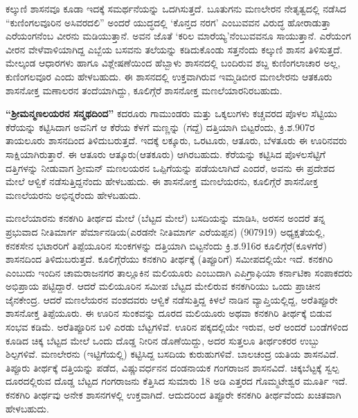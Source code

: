 ಕಲ್ಕುಣಿ ಶಾಸನವೂ ಕೂಡಾ ಇದಕ್ಕೆ ಸಮರ್ಥನೆಯನ್ನು ಒದಗಿಸುತ್ತದೆ. ಬೂತುಗನು ಮಣಲೇರನ ನೇತೃತ್ವದಲ್ಲಿ ನಡೆಸಿದ “ಕುಣಿಂಗಲವೂರಿನ ಅಸಿವರದಲಿ” ಅಂದರೆ ಯುದ್ಧದಲ್ಲಿ ‘ಕೊನ್ತದ ನರಗ’ ಎಂಬುವವನ ವಿರುದ್ಧ ಹೋರಾಡುತ್ತಾ ಎರೆಯಂಗನೆಂಬ ವೀರನು ಮಡಿಯುತ್ತಾನೆ. ಅವನ ಜೊತೆ ‘ಕರಿಲ ಮಾರೆಯ್ಯ’ನೆಂಬುವವನೂ ಸಾಯುತ್ತಾನೆ. ಎರೆಯಂಗ ವೀರನ ವೇಳೆವಾಳಿಯಾಗಿದ್ದ ಎಬ್ಬೆಯ ಬಸವನು ತಲೆಯನ್ನು ಕಡಿದುಕೊಂಡು ಸತ್ತನೆಂದು ಕಲ್ಕುಣಿ ಶಾಸನ ತಿಳಿಸುತ್ತದೆ. ಮೇಲ್ಕಂಡ ಆಧಾರಗಳು ಹಾಗೂ ವಿಶ್ಲೇಷಣೆಯಿಂದ ಹೆಬ್ಬಾಳು ಶಾಸನದಲ್ಲಿ ಬಂದಿರುವ ಶಬ್ದ ಕುಣಿಂಗಲಾಚಾರ ಅಲ್ಲ, ಕುಣಿಂಗಲವೂರ ಎಂದು ಹೇಳಬಹುದು. ಈ ಶಾಸನದಲ್ಲಿ ಉಕ್ತವಾಗಿರುವ ಇಮ್ಮಡಿಬೀರ ಮಣಲೇರನು ಆತಕೂರು ಶಾಸನೋಕ್ತ ಮಣಾಲರನ ತಂದೆಯಾಗಿದ್ದು, ಕೂಲಿಗ್ಗೆರೆ ಶಾಸನೋಕ್ತ ಮಣಲೆಯಾರನಿರಬಹುದು. 

\textbf{“ಶ‍್ರೀಮನ್ಮಣಲಯರನ ಸನ್ಮಥದಿಂದ”} ಕದರೂರು ಗಾಮುಂಡರು ಮತ್ತು ಒಕ್ಕಲುಗಳು ಕಚ್ಚವರದ ಪೊಳಲ ಸೆಟ್ಟಿಯು ಕೆರೆಯನ್ನು ಕಟ್ಟಿಸಿದಾಗ ಅವನಿಗೆ ಆ ಕೆರೆಯ ಕೆಳಗೆ ಮಣ್ಣನ್ನು (ಗದ್ದೆ) ದತ್ತಿಯಾಗಿ ಬಿಟ್ಟರೆಂದು, ಕ್ರಿ.ಶ.907ರ ತಾಯಲೂರು ಶಾಸನದಿಂದ ತಿಳಿದುಬರುತ್ತದೆ. ಇದಕ್ಕೆ ಲಕ್ಕೂರು, ಒರಟೂರು, ಆತೂರು, ಬೆಳತೂರು ಈ ಊರಿನವರು ಸಾಕ್ಷಿಯಾಗಿರುತ್ತಾರೆ. ಈ ಆತೂರು ಆತ್ಕೂರು(ಆತಕೂರು) ಆಗಿರಬಹುದು. ಕೆರೆಯನ್ನು ಕಟ್ಟಿಸಿದ ಪೊಳಲಸೆಟ್ಟಿಗೆ ದತ್ತಿಗಳನ್ನು ನೀಡುವಾಗ ಶ‍್ರೀಮನ್​ ಮಣಲಯರನ ಒಪ್ಪಿಗೆಯನ್ನು ಪಡೆಯಲಾಗಿದೆ ಎಂದರೆ, ಅವನು ಈ ಪ್ರದೇಶದ ಮೇಲೆ ಆಳ್ವಿಕೆ ನಡೆಸುತ್ತಿದ್ದನೆಂದು ಹೇಳಬಹುದು. ಈ ಶಾಸನೋಕ್ತ ಮಣಲೆಯರನು, ಕೂಲಿಗ್ಗೆರೆ ಶಾಸನೋಕ್ತ ಮಣಲೆಯರನು ಅಭಿನ್ನರೆಂದು ಹೇಳಬಹುದು.

ಮಣಲೆಯಾರನು ಕನಕಗಿರಿ ತೀರ್ಥದ ಮೇಲೆ (ಬೆಟ್ಟದ ಮೇಲೆ) ಬಸದಿಯನ್ನು ಮಾಡಿಸಿ, ಅರಸನ ಅಂದರೆ ತನ್ನ ಪ್ರಭುವಾದ ನೀತಿಮಾರ್ಗ ಪೆರ್ಮಾನಡಿಯ(ಎರಡನೇ ನೀತಿಮಾರ್ಗ ಎರೆಯಪ್ಪನ) (907919) ಅಧ್ಯಕ್ಷತೆಯಲ್ಲಿ, ಕನಕಸೇನ ಭಟಾರರಿಗೆ ತಿಪ್ಪೆಯೂರಿನ ಸುಂಕಗಳನ್ನು ದತ್ತಿಯಾಗಿ ಬಿಟ್ಟನೆಂದು ಕ್ರಿ.ಶ.916ರ ಕೂಲಿಗ್ಗೆರೆ(ಕೂಳಗೆರೆ) ಶಾಸನದಿಂದ ತಿಳಿದುಬರುತ್ತದೆ. ಕೂಲಿಗ್ಗೆರೆಯು ಕನಕಗಿರಿ ತೀರ್ಥಕ್ಕೆ (ತಿಪ್ಪೂರಿಗೆ) ಸಮೀಪದಲ್ಲಿಯೇ ಇದೆ. ಕನಕಗಿರಿ ಎಂಬುದು ಇಂದಿನ ಚಾಮರಾಜನಗರ ತಾಲ್ಲೂಕಿನ ಮಲಿಯೂರು ಎಂಬುದಾಗಿ ಎಪಿಗ್ರಾಫಿಯಾ ಕರ್ನಾಟಿಕಾ ಸಂಪಾಕದರು ಅಭಿಪ್ರಾಯ ಪಟ್ಟಿದ್ದಾರೆ. ಆದರೆ ಮಲಿಯೂರಿನ ಸಮೀಪ ಬೆಟ್ಟದ ಮೇಲಿರುವ ಕನಕಗಿರಿಯು ಒಂದು ಪ್ರಾಚೀನ ಜೈನಕೇಂದ್ರ. ಆದರೆ ಮಣಲೆಯರನ ವಂಶದವರು ಆಳ್ವಿಕೆ ನಡೆಸುತ್ತಿದ್ದ ಕಿಳಲೆ ನಾಡಿನ ವ್ಯಾಪ್ತಿಯಲ್ಲಿದ್ದ, ಅರೆತಿಪ್ಪೂರೇ ಶಾಸನೋಕ್ತ ತಿಪ್ಪೆಯೂರು. ಈ ಊರಿನ ಸುಂಕವನ್ನು ದೂರದ ಮಲಿಯೂರು ಅಥವಾ ಕನಕಗಿರಿ ತೀರ್ಥಕ್ಕೆ ಬಿಡುವ ಸಂಭವ ಕಡಿಮೆ. ಅರೆತಿಪ್ಪೂರಿನ ಬಳಿ ಎರಡು ಬೆಟ್ಟಗಳಿವೆ. ಊರಿನ ಪಕ್ಕದಲ್ಲಿಯೇ ಇರುವ, ಅರೆ ಅಂದರೆ ಬಂಡೆಗಳಿಂದ ಕೂಡಿದ ಚಿಕ್ಕ ಬೆಟ್ಟದ ಮೇಲೆ ಒಂದು ದೊಡ್ಡ ನೀರಿನ ಡೊಣೆಯಿದ್ದು, ಅದರ ಸುತ್ತಲೂ ತೀರ್ಥಂಕರರ ಉಬ್ಬು ಶಿಲ್ಪಗಳಿವೆ. ಮಣಲೇರನು (ಇಟ್ಟಿಗೆಯಲ್ಲಿ) ಕಟ್ಟಿಸಿದ್ದ ಬಸದಿಯ ಕುರುಹುಗಳಿವೆ. ಬಾಲಚಂದ್ರ ಯತಿಯ ಶಾಸನವಿದೆ. ತಿಪ್ಪೂರು ತೀರ್ಥಕ್ಕೆ ದತ್ತಿಯನ್ನು ಪಡೆದ, ವಿಷ್ಣುವರ್ಧನನ ದಂಡನಾಯಕ ಗಂಗರಾಜನ ಶಾಸನವಿದೆ. ಚಿಕ್ಕಬೆಟ್ಟಕ್ಕೆ ಸ್ವಲ್ಪ ದೂರದಲ್ಲಿರುವ ದೊಡ್ಡ ಬೆಟ್ಟದ ಗಂಗರಾಜನು ಕೆತ್ತಿಸಿದ ಸುಮಾರು 18 ಅಡಿ ಎತ್ತರದ ಗೊಮ್ಮಟೇಶ್ವರ ಮೂರ್ತಿ ಇದೆ. ಕನಕಗಿರಿ ತೀರ್ಥವು ಅನೇಕ ಶಾಸನಗಳಲ್ಲಿ ಉಕ್ತವಾಗಿದೆ. ಆದುದರಿಂದ ತಿಪ್ಪೂರೇ ಕನಕಗಿರಿ ತೀರ್ಥವೆಂದು ಖಚಿತವಾಗಿ ಹೇಳಬಹುದು. 

